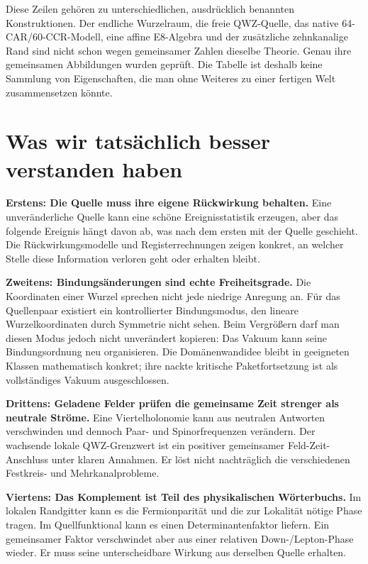 Diese Zeilen gehören zu unterschiedlichen, ausdrücklich benannten Konstruktionen. Der endliche Wurzelraum, die freie QWZ-Quelle, das native 64-CAR/60-CCR-Modell, eine affine E8-Algebra und der zusätzliche zehnkanalige Rand sind nicht schon wegen gemeinsamer Zahlen dieselbe Theorie. Genau ihre gemeinsamen Abbildungen wurden geprüft. Die Tabelle ist deshalb keine Sammlung von Eigenschaften, die man ohne Weiteres zu einer fertigen Welt zusammensetzen könnte.

\section{Was wir tatsächlich besser verstanden haben}
\textbf{Erstens: Die Quelle muss ihre eigene Rückwirkung behalten.} Eine unveränderliche Quelle kann eine schöne Ereignisstatistik erzeugen, aber das folgende Ereignis hängt davon ab, was nach dem ersten mit der Quelle geschieht. Die Rückwirkungsmodelle und Registerrechnungen zeigen konkret, an welcher Stelle diese Information verloren geht oder erhalten bleibt. 

\textbf{Zweitens: Bindungsänderungen sind echte Freiheitsgrade.} Die Koordinaten einer Wurzel sprechen nicht jede niedrige Anregung an. Für das Quellenpaar existiert ein kontrollierter Bindungsmodus, den lineare Wurzelkoordinaten durch Symmetrie nicht sehen. Beim Vergrößern darf man diesen Modus jedoch nicht unverändert kopieren: Das Vakuum kann seine Bindungsordnung neu organisieren. Die Domänenwandidee bleibt in geeigneten Klassen mathematisch konkret; ihre nackte kritische Paketfortsetzung ist als vollständiges Vakuum ausgeschlossen. 

\textbf{Drittens: Geladene Felder prüfen die gemeinsame Zeit strenger als neutrale Ströme.} Eine Viertelholonomie kann aus neutralen Antworten verschwinden und dennoch Paar- und Spinorfrequenzen verändern. Der wachsende lokale QWZ-Grenzwert ist ein positiver gemeinsamer Feld-Zeit-Anschluss unter klaren Annahmen. Er löst nicht nachträglich die verschiedenen Festkreis- und Mehrkanalprobleme. 

\textbf{Viertens: Das Komplement ist Teil des physikalischen Wörterbuchs.} Im lokalen Randgitter kann es die Fermionparität und die zur Lokalität nötige Phase tragen. Im Quellfunktional kann es einen Determinantenfaktor liefern. Ein gemeinsamer Faktor verschwindet aber aus einer relativen Down-/Lepton-Phase wieder. Er muss seine unterscheidbare Wirkung aus derselben Quelle erhalten. 

